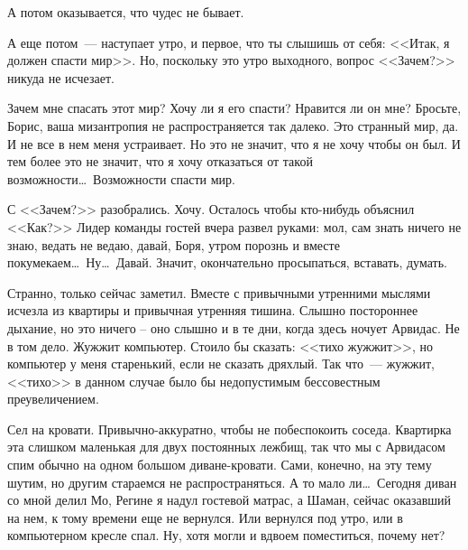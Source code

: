 А потом оказывается, что чудес не бывает.


А еще потом~--- наступает утро, и первое, что ты слышишь от себя: <<Итак, я 
должен 
спасти мир>>. Но, поскольку это утро выходного, вопрос <<Зачем?>> никуда не 
исчезает.


Зачем мне спасать этот мир? Хочу ли я его спасти? Нравится ли он мне? Бросьте, 
Борис, ваша мизантропия не распространяется так далеко. Это странный мир, да. И 
не все в нем меня устраивает. Но это не значит, что я не хочу чтобы он был. И 
тем более это не значит, что я хочу отказаться от такой возможности\ldots\ 
Возможности спасти мир.


С <<Зачем?>> разобрались. Хочу. Осталось чтобы кто-нибудь объяснил <<Как?>> 
Лидер 
команды гостей вчера развел руками: мол, сам знать ничего не знаю, ведать не 
ведаю, давай, Боря, утром порознь и вместе покумекаем\ldots\ Ну\ldots\ Давай. 
Значит, 
окончательно просыпаться, вставать, думать.


Странно, только сейчас заметил. Вместе с привычными утренними мыслями исчезла 
из 
квартиры и привычная утренняя тишина. Слышно постороннее дыхание, но это ничего 
– оно слышно и в те дни, когда здесь ночует Арвидас. Не в том дело. Жужжит 
компьютер. Стоило бы сказать: <<тихо жужжит>>, но компьютер у меня старенький, 
если не сказать дряхлый. Так что~--- жужжит, <<тихо>> в данном случае было бы 
недопустимым бессовестным преувеличением.


Сел на кровати. Привычно-аккуратно, чтобы не побеспокоить соседа. Квартирка эта 
слишком маленькая для двух постоянных лежбищ, так что мы с Арвидасом спим 
обычно 
на одном большом диване-кровати. Сами, конечно, на эту тему шутим, но другим 
стараемся не распространяться. А то мало ли\ldots\ Сегодня диван со мной делил 
Мо, 
Регине я надул гостевой матрас, а Шаман, сейчас оказавший на нем, к тому 
времени 
еще не вернулся. Или вернулся под утро, или в компьютерном кресле спал. Ну, 
хотя 
могли и вдвоем поместиться, почему нет?

